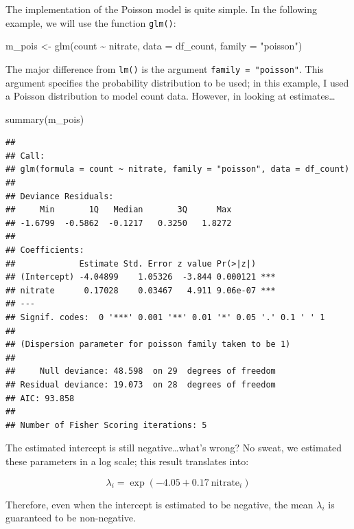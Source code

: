 \documentclass[
]{article}
\newenvironment{Shaded}{\begin{snugshade}}{\end{snugshade}}
\newcommand{\AttributeTok}[1]{\textcolor[rgb]{0.77,0.63,0.00}{#1}}
\newcommand{\FunctionTok}[1]{\textcolor[rgb]{0.00,0.00,0.00}{#1}}
\newcommand{\NormalTok}[1]{#1}
\newcommand{\OtherTok}[1]{\textcolor[rgb]{0.56,0.35,0.01}{#1}}
\newcommand{\SpecialCharTok}[1]{\textcolor[rgb]{0.00,0.00,0.00}{#1}}
\newcommand{\StringTok}[1]{\textcolor[rgb]{0.31,0.60,0.02}{#1}}
\begin{document}
The implementation of the Poisson model is quite simple. In the following example, we will use the function \texttt{glm()}:

\begin{Shaded}
\begin{Highlighting}[]
\NormalTok{m\_pois }\OtherTok{\textless{}{-}} \FunctionTok{glm}\NormalTok{(count }\SpecialCharTok{\textasciitilde{}}\NormalTok{ nitrate,}
              \AttributeTok{data =}\NormalTok{ df\_count,}
              \AttributeTok{family =} \StringTok{"poisson"}\NormalTok{)}
\end{Highlighting}
\end{Shaded}

The major difference from \texttt{lm()} is the argument \texttt{family\ =\ "poisson"}. This argument specifies the probability distribution to be used; in this example, I used a Poisson distribution to model count data. However, in looking at estimates\ldots{}

\begin{Shaded}
\begin{Highlighting}[]
\FunctionTok{summary}\NormalTok{(m\_pois)}
\end{Highlighting}
\end{Shaded}

\begin{verbatim}
## 
## Call:
## glm(formula = count ~ nitrate, family = "poisson", data = df_count)
## 
## Deviance Residuals: 
##     Min       1Q   Median       3Q      Max  
## -1.6799  -0.5862  -0.1217   0.3250   1.8272  
## 
## Coefficients:
##             Estimate Std. Error z value Pr(>|z|)    
## (Intercept) -4.04899    1.05326  -3.844 0.000121 ***
## nitrate      0.17028    0.03467   4.911 9.06e-07 ***
## ---
## Signif. codes:  0 '***' 0.001 '**' 0.01 '*' 0.05 '.' 0.1 ' ' 1
## 
## (Dispersion parameter for poisson family taken to be 1)
## 
##     Null deviance: 48.598  on 29  degrees of freedom
## Residual deviance: 19.073  on 28  degrees of freedom
## AIC: 93.858
## 
## Number of Fisher Scoring iterations: 5
\end{verbatim}

The estimated intercept is still negative\ldots what's wrong? No sweat, we estimated these parameters in a log scale; this result translates into:

\[
\lambda_i = \exp(-4.05 + 0.17~\text{nitrate}_i)
\]

Therefore, even when the intercept is estimated to be negative, the mean \(\lambda_i\) is guaranteed to be non-negative.
\end{document}
